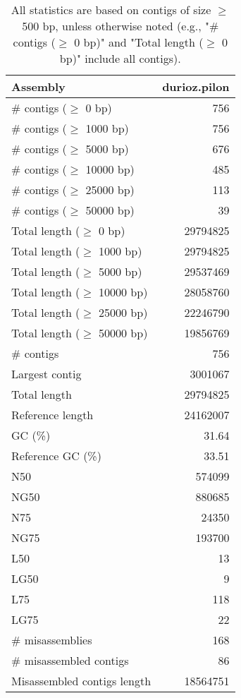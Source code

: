 \documentclass[12pt,a4paper]{article}
\begin{document}
\begin{table}[ht]
\begin{center}
\caption{All statistics are based on contigs of size $\geq$ 500 bp, unless otherwise noted (e.g., "\# contigs ($\geq$ 0 bp)" and "Total length ($\geq$ 0 bp)" include all contigs).}
\begin{tabular}{|l*{1}{|r}|}
\hline
Assembly & durioz.pilon \\ \hline
\# contigs ($\geq$ 0 bp) & 756 \\ \hline
\# contigs ($\geq$ 1000 bp) & 756 \\ \hline
\# contigs ($\geq$ 5000 bp) & 676 \\ \hline
\# contigs ($\geq$ 10000 bp) & 485 \\ \hline
\# contigs ($\geq$ 25000 bp) & 113 \\ \hline
\# contigs ($\geq$ 50000 bp) & 39 \\ \hline
Total length ($\geq$ 0 bp) & 29794825 \\ \hline
Total length ($\geq$ 1000 bp) & 29794825 \\ \hline
Total length ($\geq$ 5000 bp) & 29537469 \\ \hline
Total length ($\geq$ 10000 bp) & 28058760 \\ \hline
Total length ($\geq$ 25000 bp) & 22246790 \\ \hline
Total length ($\geq$ 50000 bp) & 19856769 \\ \hline
\# contigs & 756 \\ \hline
Largest contig & 3001067 \\ \hline
Total length & 29794825 \\ \hline
Reference length & 24162007 \\ \hline
GC (\%) & 31.64 \\ \hline
Reference GC (\%) & 33.51 \\ \hline
N50 & 574099 \\ \hline
NG50 & 880685 \\ \hline
N75 & 24350 \\ \hline
NG75 & 193700 \\ \hline
L50 & 13 \\ \hline
LG50 & 9 \\ \hline
L75 & 118 \\ \hline
LG75 & 22 \\ \hline
\# misassemblies & 168 \\ \hline
\# misassembled contigs & 86 \\ \hline
Misassembled contigs length & 18564751 \\ \hline

\end{tabular}
\end{center}
\end{table}
\end{document}
